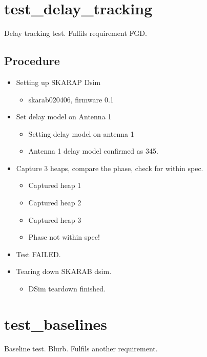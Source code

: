 \documentclass{article}%
\begin{document}
%
\section{test\_delay\_tracking}%
\label{sec:testdelaytracking}%
Delay tracking test.\newline%
\newline%
    Fulfils requirement FGD.\newline%
\subsection{Procedure}%
\label{subsec:Procedure}%
\begin{itemize}%
\item%
Setting up SKARAP Dsim%
\begin{itemize}%
\item%
skarab020406, firmware 0.1%
\end{itemize}%
\item%
Set delay model on Antenna 1%
\begin{itemize}%
\item%
Setting delay model on antenna 1%
\item%
Antenna 1 delay model confirmed as 345.%
\end{itemize}%
\item%
Capture 3 heaps, compare the phase, check for within spec.%
\begin{itemize}%
\item%
Captured heap 1%
\item%
Captured heap 2%
\item%
Captured heap 3%
\item%
Phase not within spec!%
\end{itemize}%
\item%
Test FAILED.%
%
\item%
Tearing down SKARAB dsim.%
\begin{itemize}%
\item%
DSim teardown finished.%
\end{itemize}%
\end{itemize}

%
\section{test\_baselines}%
\label{sec:testbaselines}%
Baseline test.\newline%
\newline%
    Blurb.\newline%
\newline%
    Fulfils another requirement.\newline%
\end{document}
